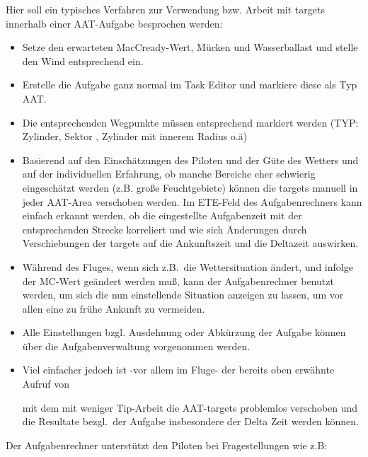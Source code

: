 Hier soll ein typisches Verfahren zur Verwendung bzw. Arbeit mit targets innerhalb einer AAT-Aufgabe besprochen werden:
\begin{itemize}
\item Setze den erwarteten MacCready-Wert, Mücken und Wasserballast und stelle den Wind entsprechend ein.
\item Erstelle die Aufgabe ganz normal im Task Editor und markiere diese als Typ AAT.
\item  Die entsprechenden Wegpunkte müssen entsprechend markiert werden (TYP: Zylinder, Sektor , Zylinder mit innerem Radius o.ä)
\item Basierend auf den Einschätzungen des Piloten und der Güte des Wetters und auf der individuellen Erfahrung, ob manche Bereiche eher schwierig eingeschätzt werden (z.B. große Feuchtgebiete) können die targets manuell in jeder AAT-Area verschoben werden.
Im \textsf{ETE}-Feld des Aufgabenrechners kann einfach erkannt werden, ob die eingestellte Aufgabenzeit mit der entsprechenden Strecke korreliert und wie sich Änderungen durch Verschiebungen der targets auf die Ankunftszeit und die Deltazeit  auswirken.
\item Während des Fluges, wenn sich z.B.\ die Wettersituation ändert, und infolge der MC-Wert geändert werden muß,
    kann der Aufgabenrechner benutzt werden, um sich die nun  einstellende Situation anzeigen zu lassen, um vor allen eine zu frühe Ankunft zu vermeiden.
\item Alle Einstellungen bzgl. Ausdehnung oder Abkürzung der Aufgabe können über die Aufgabenverwaltung vorgenommen werden.
\item \textcolor[rgb]{0.00,0.25,0.50}{\textsf{Viel einfacher jedoch ist -vor allem im Fluge- der bereits oben erwähnte Aufruf von}}
\begin{center}
\blink{}\blink{}
mit dem mit weniger Tip-Arbeit die AAT-targets problemlos verschoben und die Resultate bezgl.\ der Aufgabe insbesondere der Delta Zeit werden können.
\end{center}
\end{itemize}
Der Aufgabenrechner unterstützt den Piloten bei Fragestellungen wie z.B:\
